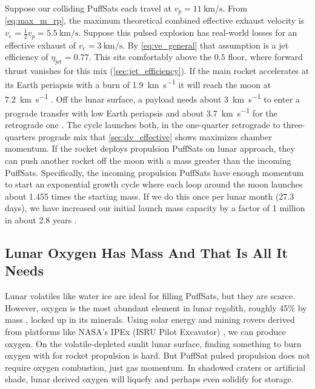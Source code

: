 \documentclass{article}
\begin{document}
Suppose our colliding PuffSats each travel at $v_p=\SI{11}{\kilo\meter\per\second}$.  From \autoref{eq:max_m_rp}, the maximum theoretical combined effective exhaust velocity is $v_e = \frac{1}{2}v_p = \SI{5.5}{\kilo\meter\per\second}$.  Suppose this pulsed explosion has real-world losses for an effective exhaust of $v_e = \SI{3}{\kilo\meter\per\second}$.  By \autoref{eq:ve_general} that assumption is a jet efficiency of $\eta_{\mathrm{jet}} = 0.77$. This sits comfortably above the $0.5$ floor, where forward thrust vanishes for this mix (\autoref{sec:jet_efficiency}).   If the main rocket accelerates at its Earth periapsis with a burn of \SI{1.9}{\kilo\meter\per\second} it will reach the moon at \SI{7.2}{\kilo\meter\per\second} \cite{Katz_aim_is_all_you_need_2025}.   Off the lunar surface, a payload needs about \SI{3}{\kilo\meter\per\second} to enter a prograde transfer with low Earth periapsis and about \SI{3.7}{\kilo\meter\per\second} for the retrograde one \cite{Katz_aim_is_all_you_need_2025}.  The cycle launches both, in the one-quarter retrograde to three-quarters prograde mix that \autoref{sec:dv_effective} shows maximizes chamber momentum.   If the rocket deploys propulsion PuffSats on lunar approach, they can push another rocket off the moon with a mass greater than the incoming PuffSats. Specifically, the incoming propulsion PuffSats have enough momentum to start an exponential growth cycle where each loop around the moon launches about 1.455 times the starting mass.   If we do this once per lunar month (27.3 days), we have increased our initial launch mass capacity by a factor of 1 million in about 2.8 years \cite{Katz_aim_is_all_you_need_2025}.

\subsection{Lunar Oxygen Has Mass And That Is All It Needs}\label{sec:lunar_mining}
Lunar volatiles like water ice are ideal for filling PuffSats, but they are scarce.   However, oxygen is the most abundant element in lunar regolith, roughly 45\% by mass \cite{mckay1991lunar}, locked up in its minerals.   Using solar energy and mining rovers derived from platforms like NASA's IPEx (ISRU Pilot Excavator) \cite{ipex_pilot_excavator}, we can produce oxygen.  On the volatile-depleted sunlit lunar surface, finding something to burn oxygen with for rocket propulsion is hard.   But PuffSat pulsed propulsion does not require oxygen combustion, just gas momentum.  In shadowed craters or artificial shade, lunar derived oxygen will liquefy and perhaps even solidify for storage.  
\end{document}
